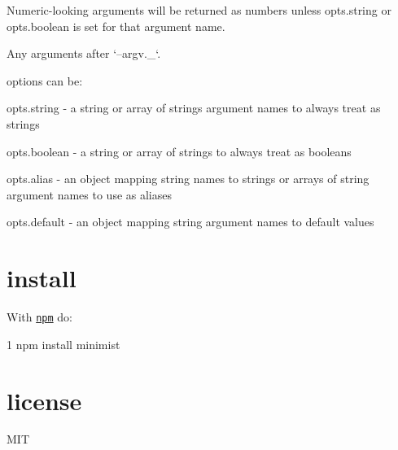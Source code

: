Numeric-\/looking arguments will be returned as numbers unless {\ttfamily opts.\+string} or {\ttfamily opts.\+boolean} is set for that argument name.

Any arguments after `\textquotesingle{}--argv.\+\_\+`.

options can be\+:


\begin{DoxyItemize}
\item {\ttfamily opts.\+string} -\/ a string or array of strings argument names to always treat as strings
\item {\ttfamily opts.\+boolean} -\/ a string or array of strings to always treat as booleans
\item {\ttfamily opts.\+alias} -\/ an object mapping string names to strings or arrays of string argument names to use as aliases
\item {\ttfamily opts.\+default} -\/ an object mapping string argument names to default values
\end{DoxyItemize}

\section*{install}

With \href{https://npmjs.org}{\tt npm} do\+:


\begin{DoxyCode}
1 npm install minimist
\end{DoxyCode}


\section*{license}

M\+I\+T 